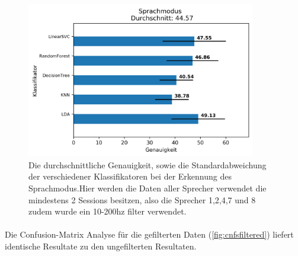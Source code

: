 \begin{figure}[H]
  \centering
  \includegraphics[width=100mm ,scale=0.6]{modeResultsUser10too200hz.png}
  \caption{Die durchschnittliche Genauigkeit, sowie die Standardabweichung der verschiedener Klassifikatoren bei der Erkennung des Sprachmodus.Hier werden die Daten aller Sprecher verwendet die mindestens 2 Sessions besitzen, also die Sprecher 1,2,4,7 und 8 zudem wurde ein 10-200hz filter verwendet.}
  \label{fig:mode5}
\end{figure}

\paragraph{}
Die Confusion-Matrix Analyse für die gefilterten Daten (\ref{fig:cnfsfiltered}) liefert identische Resultate zu den ungefilterten Resultaten.

